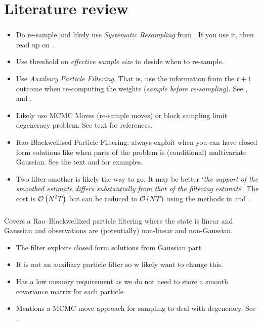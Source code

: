 \section{Literature review}
\subsubsection*{\cite{doucet09}}
\begin{itemize}
	\item Do re-sample and likely use \emph{Systematic Resampling} from \cite{kitagawa96}. If you use it, then read up on \cite{douc05}.
	\item Use threshold on \emph{effective sample size} to deside when to re-sample.
	\item Use \emph{Auxiliary Particle Filtering}. That is, use the information from the $t + 1$ outcome when re-computing the weights (\textit{sample before re-sampling}). See \cite{carpenter99}, \cite{pitt01} and \cite{pitt99}.
	\item Likely use MCMC Moves (re-sample moves) or block sampling limit degeneracy problem. See text for references.
	\item Rao-Blackwellised Particle Filtering: always exploit when you can have closed form solutions like when parts of the problem is (conditional) multivariate Gaussian. See the text and \cite{andrieu02} for examples. 
	\item Two filter smother is likely the way to go. It may be better `\textit{the support of the smoothed estimate differs substantially from that of the filtering estimate}`. The cost is $\mathcal{O}\left( N^2T\right)$ but can be reduced to $\mathcal{O}\left( NT\right)$ using the methods in \cite{fearnhead10} and \cite{briers05}.
\end{itemize}

\subsubsection*{\cite{andrieu02}}
Covers a Rao–Blackwellized particle filtering where the state is linear and Gaussian and observations are (potentially) non-linear and non-Gaussian. 

\begin{itemize}
	\item The filter exploits closed form solutions from Gaussian part.
	\item It is not an auxiliary particle filter so w likely want to change this.
	\item Has a low memory requirement as we do not need to store a smooth covariance matrix for each particle.
	\item Mentions a MCMC move approach for sampling to deal with degeneracy. See \cite{de97}.
\end{itemize}

